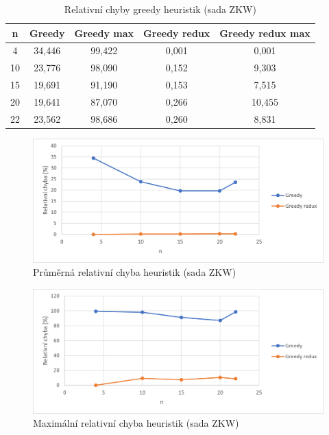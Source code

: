 \documentclass[12pt]{article}
\begin{document}
\begin{table}
    \begin{center}
         \begin{tabular}{|c | c | c | c | c|} 
         \hline
         n & Greedy & Greedy max & Greedy redux & Greedy redux max \\ [0.1ex] 
         \hline\hline
        4 & 34,446 & 99,422 & 0,001 & 0,001 \\
        \hline
        10 & 23,776 & 98,090 & 0,152 & 9,303 \\
        \hline
        15 & 19,691 & 91,190 & 0,153 & 7,515 \\
        \hline
        20 & 19,641 & 87,070 & 0,266 & 10,455 \\
        \hline
        22 & 23,562 & 98,686 & 0,260 & 8,831 \\
        \hline
        \end{tabular}
        \caption{Relativní chyby greedy heuristik (sada ZKW)} \label{tab:zkw_greedy_error}
    \end{center}
\end{table}

\begin{figure}[ht]\centering
    \includegraphics[width=1\textwidth, keepaspectratio]{graphs/ZKW/heuristics/zkw_greedy_avg.png}
    \caption{Průměrná relativní chyba heuristik (sada ZKW)}
    \label{fig:zkw_greedy_avg}
\end{figure}

\begin{figure}[ht]\centering
    \includegraphics[width=1\textwidth, keepaspectratio]{graphs/ZKW/heuristics/zkw_greedy_max.png}
    \caption{Maximální relativní chyba heuristik (sada ZKW)}
    \label{fig:zkw_greedy_max}
\end{figure}
\end{document}
